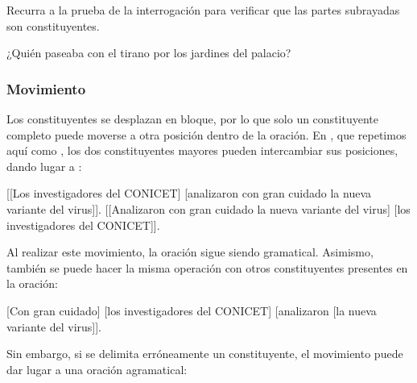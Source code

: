 \begin{ejercicio}\label{ej:05-bioy}
Recurra a la prueba de la interrogación para verificar que las partes subrayadas
son constituyentes.


\begin{resuelto}
¿Quién paseaba con el tirano por los jardines del palacio?
\end{resuelto}
\end{ejercicio}

\subsubsection{Movimiento}\label{sec:05-movimiento}

Los constituyentes se desplazan en bloque, por lo que solo un constituyente
completo puede moverse a otra posición dentro de la oración. En
, que repetimos aquí como , los dos
constituyentes mayores pueden intercambiar sus posiciones, dando lugar a
:

\begin{exe}
  \ex\label{ex:05-mov}
    \begin{xlist}
      \ex\label{ex:05-mov-a} {}[[Los investigadores del CONICET] [analizaron con
          gran cuidado la nueva variante del virus]].
      \ex\label{ex:05-mov-b} {}[[Analizaron con gran cuidado la nueva variante
          del virus] [los investigadores del CONICET]].
    \end{xlist}
\end{exe}

Al realizar este movimiento, la oración sigue siendo gramatical. Asimismo,
también se puede hacer la misma operación con otros constituyentes presentes en
la oración:

\begin{exe}
  \ex {}[Con gran cuidado] [los investigadores del CONICET] [analizaron [la nueva
      variante del virus]].
\end{exe}

Sin embargo, si se delimita erróneamente un constituyente, el movimiento puede
dar lugar a una oración agramatical:

